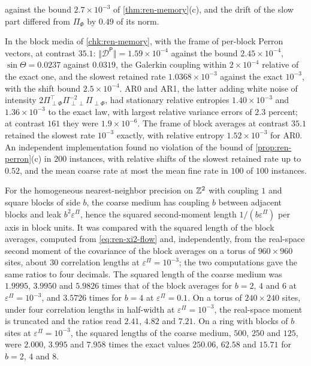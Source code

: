 \begin{numcheck}
against the bound $2.7\times10^{-3}$ of \cref{thm:ren-memory}(c), and the drift of the slow part differed from $\Pi_\Phi$ by $0.49$ of its norm.
\end{numcheck}

\begin{numcheck}\label{chk:ren-perron}
In the block media of \cref{chk:ren-memory}, with the frame of per-block Perron vectors, at contrast $35.1$: $\Vert\mathcal D^{\mathsf P}\Vert=1.59\times10^{-4}$ against the bound $2.45\times10^{-4}$, $\sin\Theta=0.0237$ against $0.0319$, the Galerkin coupling within $2\times10^{-4}$ relative of the exact one, and the slowest retained rate $1.0368\times10^{-3}$ against the exact $10^{-3}$, with the shift bound $2.5\times10^{-4}$. AR0 and AR1, the latter adding white noise of intensity $2\Pi_{\perp\Phi}^\top\Pi_{\perp\perp}^{-2}\Pi_{\perp\Phi}$, had stationary relative entropies $1.40\times10^{-3}$ and $1.36\times10^{-3}$ to the exact law, with largest relative variance errors of $2.3$ percent; at contrast $161$ they were $1.9\times10^{-6}$. The frame of block averages at contrast $35.1$ retained the slowest rate $10^{-3}$ exactly, with relative entropy $1.52\times10^{-3}$ for AR0. An independent implementation found no violation of the bound of \cref{prop:ren-perron}(c) in $200$ instances, with relative shifts of the slowest retained rate up to $0.52$, and the mean coarse rate at most the mean fine rate in $100$ of $100$ instances.
\end{numcheck}

\begin{numcheck}\label{chk:ren-no-contrast}
For the homogeneous nearest-neighbor precision on $\mathbb{Z}^2$ with coupling $1$ and square blocks of side $b$, the coarse medium has coupling $b$ between adjacent blocks and leak $b^2\varepsilon^\Pi$, hence the squared second-moment length $1/(b\varepsilon^\Pi)$ per axis in block units. It was compared with the squared length of the block averages, computed from \cref{eq:ren-xi2-flow} and, independently, from the real-space second moment of the covariance of the block averages on a torus of $960\times960$ sites, about $30$ correlation lengths at $\varepsilon^\Pi=10^{-3}$; the two computations gave the same ratios to four decimals. The squared length of the coarse medium was $1.9995$, $3.9950$ and $5.9826$ times that of the block averages for $b=2$, $4$ and $6$ at $\varepsilon^\Pi=10^{-3}$, and $3.5726$ times for $b=4$ at $\varepsilon^\Pi=0.1$. On a torus of $240\times240$ sites, under four correlation lengths in half-width at $\varepsilon^\Pi=10^{-3}$, the real-space moment is truncated and the ratios read $2.41$, $4.82$ and $7.21$. On a ring with blocks of $b$ sites at $\varepsilon^\Pi=10^{-3}$, the squared lengths of the coarse medium, $500$, $250$ and $125$, were $2.000$, $3.995$ and $7.958$ times the exact values $250.06$, $62.58$ and $15.71$ for $b=2$, $4$ and $8$.
\end{numcheck}

